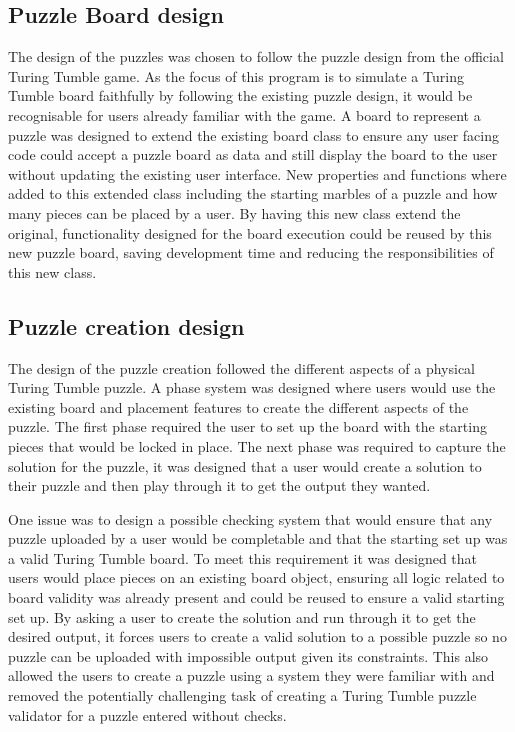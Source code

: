 \documentclass{l4proj}
\begin{document}
\subsection{Puzzle Board design}
The design of the puzzles was chosen to follow the puzzle design from the official Turing Tumble game. As the focus of this program is to simulate a Turing Tumble board faithfully by following the existing puzzle design, it would be recognisable for users already familiar with the game. A board to represent a puzzle was designed to extend the existing board class to ensure any user facing code could accept a puzzle board as data and still display the board to the user without updating the existing user interface. New properties and functions where added to this extended class including the starting marbles of a puzzle and how many pieces can be placed by a user. By having this new class extend the original, functionality designed for the board execution could be reused by this new puzzle board, saving development time and reducing the responsibilities of this new class. 

\subsection{Puzzle creation design}
The design of the puzzle creation followed the different aspects of a physical Turing Tumble puzzle. A phase system was designed where users would use the existing board and placement features to create the different aspects of the puzzle. The first phase required the user to set up the board with the starting pieces that would be locked in place. The next phase was required to capture the solution for the puzzle, it was designed that a user would create a solution to their puzzle and then play through it to get the output they wanted. 

One issue was to design a possible checking system that would ensure that any puzzle uploaded by a user would be completable and that the starting set up was a valid Turing Tumble board. To meet this requirement it was designed that users would place pieces on an existing board object, ensuring all logic related to board validity was already present and could be reused to ensure a valid starting set up. By asking a user to create the solution and run through it to get the desired output, it forces users to create a valid solution to a possible puzzle so no puzzle can be uploaded with impossible output given its constraints. This also allowed the users to create a puzzle using a system they were familiar with and removed the potentially challenging task of creating a Turing Tumble puzzle validator for a puzzle entered without checks. 
\end{document}
